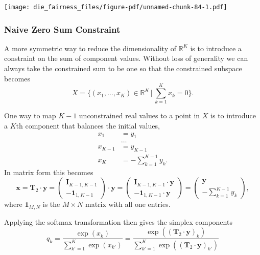 \documentclass[
  letterpaper,
  DIV=11,
  numbers=noendperiod]{scrartcl}
\begin{document}
\texttt{[image: die\_fairness\_files/figure-pdf/unnamed-chunk-84-1.pdf]}

\subsubsection{Naive Zero Sum
Constraint}\label{naive-zero-sum-constraint}

A more symmetric way to reduce the dimensionality of \(\mathbb{R}^{K}\)
is to introduce a constraint on the sum of component values. Without
loss of generality we can always take the constrained sum to be one so
that the constrained subspace becomes \[
X = \bigg\{ (x_{1}, \ldots, x_{K}) \in \mathbb{R}^{K} \, \bigg\vert \,
            \sum_{k = 1}^{K} x_{k} = 0 \bigg\}.
\]

One way to map \(K - 1\) unconstrained real values to a point in \(X\)
is to introduce a \(K\)th component that balances the initial values,
\begin{align*}
x_{1} &= y_{1}
\\
& \ldots
\\
x_{K - 1} &= y_{K - 1}
\\
x_{K} &= - \sum_{k = 1}^{K - 1} y_{k}.
\end{align*} In matrix form this becomes \[
\mathbf{x}
=
\mathbf{T}_{2} \cdot \mathbf{y}
=
\begin{pmatrix}
\mathbf{I}_{K - 1, K - 1} \\
-\mathbf{1}_{1, K - 1}
\end{pmatrix}
\cdot
\mathbf{y}
=
\begin{pmatrix}
\mathbf{I}_{K - 1, K - 1} \cdot \mathbf{y} \\
-\mathbf{1}_{1, K - 1} \cdot \mathbf{y}
\end{pmatrix}
=
\begin{pmatrix}
\mathbf{y} \\
- \sum_{k = 1}^{K - 1} y_{k}
\end{pmatrix},
\] where \(\mathbf{1}_{M, N}\) is the \(M \times N\) matrix with all one
entries.

Applying the softmax transformation then gives the simplex components \[
q_{k}
=
\frac{ \exp( x_{k} ) }
{ \sum_{k' = 1}^{K} \exp( x_{k'} ) }
=
\frac{ \exp( ( \mathbf{T}_{2} \cdot \mathbf{y} )_{k} ) }
{ \sum_{k' = 1}^{K} \exp( ( \mathbf{T}_{2} \cdot \mathbf{y} )_{k'} ) }
\]
\end{document}
